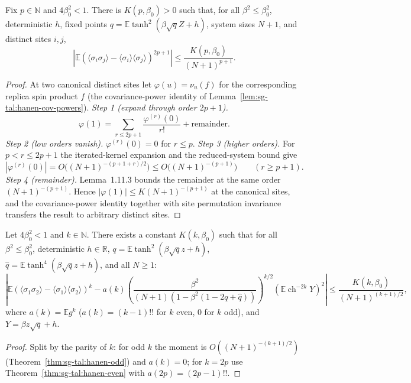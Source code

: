 \begin{theorem}\label{thm:sg-tal:hanen-odd}
\leanok
{}
Fix $p\in\mathbb N$ and $4\beta_0^2<1$. There is $K(p,\beta_0)>0$ such that, for
all $\beta^2\le\beta_0^2$, deterministic $h$, fixed points
$q=\mathbb E\tanh^2(\beta\sqrt q Z+h)$, system sizes $N+1$, and distinct sites $i,j$,
\[
\left|\mathbb E\left(\langle\sigma_i\sigma_j\rangle
 -\langle\sigma_i\rangle\langle\sigma_j\rangle\right)^{2p+1}\right|
\le \frac{K(p,\beta_0)}{(N+1)^{p+1}}.
\]
\end{theorem}
\begin{proof}
\leanok
At two canonical distinct sites let $\varphi(u)=\nu_u(f)$ for the corresponding replica spin product $f$ (the covariance-power identity of Lemma~\ref{lem:sg-tal:hanen-cov-powers}).
\emph{Step 1 (expand through order $2p+1$).}
\[
\varphi(1)=\sum_{r\le2p+1}\frac{\varphi^{(r)}(0)}{r!}+\text{remainder}.
\]
\emph{Step 2 (low orders vanish).} $\varphi^{(r)}(0)=0$ for $r\le p$.
\emph{Step 3 (higher orders).} For $p<r\le2p+1$ the iterated-kernel expansion and the reduced-system bound give
\[
|\varphi^{(r)}(0)|=O\big((N+1)^{-(p+1+r)/2}\big)\le O\big((N+1)^{-(p+1)}\big)\qquad(r\ge p+1).
\]
\emph{Step 4 (remainder).} Lemma~1.11.3 bounds the remainder at the same order $(N+1)^{-(p+1)}$.
Hence $|\varphi(1)|\le K(N+1)^{-(p+1)}$ at the canonical sites, and the covariance-power identity together with site permutation invariance transfers the result to arbitrary distinct sites.
\end{proof}

\begin{theorem}\label{thm:sg-tal:hanen-theorem}
\leanok
{}
Let $4\beta_0^2 < 1$ and $k \in \mathbb N$.
There exists a constant $K(k, \beta_0)$ such that for all $\beta^2 \le \beta_0^2$, deterministic $h \in \mathbb R$,
$q = \mathbb E \tanh^2(\beta \sqrt{q} z + h)$, $\hat q = \mathbb E \tanh^4(\beta \sqrt{q} z + h)$, and all $N \ge 1$:
\[
\left| \mathbb E(\langle \sigma_1 \sigma_2 \rangle - \langle \sigma_1 \rangle \langle \sigma_2 \rangle)^k
- a(k) \left( \frac{\beta^2}{(N+1)(1 - \beta^2(1 - 2q + \hat q))} \right)^{k/2} (\mathbb E \operatorname{ch}^{-2k} Y)^2 \right|
\le \frac{K(k, \beta_0)}{(N+1)^{(k+1)/2}},
\]
where $a(k) = \mathbb E g^k$ ($a(k) = (k-1)!!$ for $k$ even, $0$ for $k$ odd), and $Y = \beta z \sqrt{q} + h$.
\end{theorem}
\begin{proof}
\leanok
Split by the parity of $k$: for odd $k$ the moment is $O((N+1)^{-(k+1)/2})$ (Theorem~\ref{thm:sg-tal:hanen-odd}) and $a(k)=0$; for $k=2p$ use Theorem~\ref{thm:sg-tal:hanen-even} with $a(2p)=(2p-1)!!$.
\end{proof}

